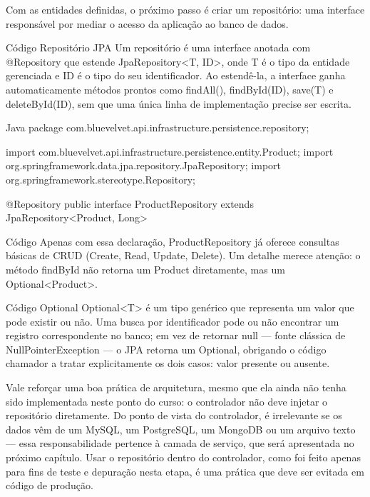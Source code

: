 Com as entidades definidas, o próximo passo é criar um repositório: uma interface responsável por mediar o acesso da aplicação ao banco de dados.

\begin{codebox}{Código}
Repositório JPA
Um repositório é uma interface anotada com @Repository que estende
JpaRepository<T, ID>, onde T é o tipo da entidade gerenciada e ID é o tipo
do seu identificador. Ao estendê-la, a interface ganha automaticamente métodos
prontos como findAll(), findById(ID), save(T) e deleteById(ID), sem que
uma única linha de implementação precise ser escrita.
\end{codebox}

\begin{codebox}{Java}
package com.bluevelvet.api.infrastructure.persistence.repository;

import com.bluevelvet.api.infrastructure.persistence.entity.Product;
import org.springframework.data.jpa.repository.JpaRepository;
import org.springframework.stereotype.Repository;

@Repository
public interface ProductRepository extends JpaRepository<Product, Long> {
}
\end{codebox}

\begin{codebox}{Código}
Apenas com essa declaração, ProductRepository já oferece consultas básicas
de CRUD (Create, Read, Update, Delete). Um detalhe merece atenção: o método
findById não retorna um Product diretamente, mas um Optional<Product>.
\end{codebox}

\begin{codebox}{Código}
Optional
Optional<T> é um tipo genérico que representa um valor que pode existir ou não.
Uma busca por identificador pode ou não encontrar um registro correspondente no
banco; em vez de retornar null — fonte clássica de NullPointerException — o
JPA retorna um Optional, obrigando o código chamador a tratar explicitamente
os dois casos: valor presente ou ausente.
\end{codebox}

Vale reforçar uma boa prática de arquitetura, mesmo que ela ainda não tenha sido implementada neste ponto do curso: o controlador não deve injetar o repositório diretamente. Do ponto de vista do controlador, é irrelevante se os dados vêm de um MySQL, um PostgreSQL, um MongoDB ou um arquivo texto — essa responsabilidade pertence à camada de serviço, que será apresentada no próximo capítulo. Usar o repositório dentro do controlador, como foi feito apenas para fins de teste e depuração nesta etapa, é uma prática que deve ser evitada em código de produção.

